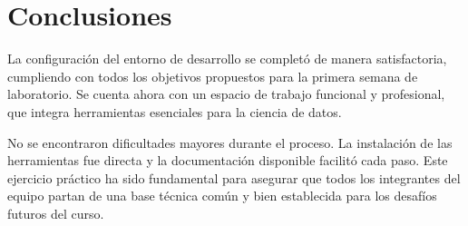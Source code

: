 \documentclass[12pt,a4paper]{article}
\begin{document}
\section{Conclusiones}
La configuración del entorno de desarrollo se completó de manera satisfactoria, cumpliendo con todos los objetivos propuestos para la primera semana de laboratorio. Se cuenta ahora con un espacio de trabajo funcional y profesional, que integra herramientas esenciales para la ciencia de datos.

No se encontraron dificultades mayores durante el proceso. La instalación de las herramientas fue directa y la documentación disponible facilitó cada paso. Este ejercicio práctico ha sido fundamental para asegurar que todos los integrantes del equipo partan de una base técnica común y bien establecida para los desafíos futuros del curso.
\end{document}
